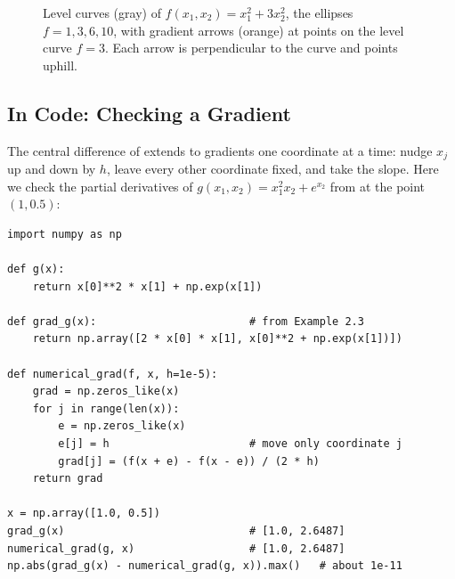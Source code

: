 \begin{figure}[ht]
  \centering
  \caption{Level curves (gray) of $f(x_1, x_2) = x_1^2 + 3x_2^2$, the
    ellipses $f = 1, 3, 6, 10$, with gradient arrows (orange) at points on
    the level curve $f = 3$. Each arrow is perpendicular to the curve and
    points uphill.}
  \label{fig:ch02-gradient}
\end{figure}

\subsection{In Code: Checking a Gradient}
\label{sec:ch02-gradient-code}

The central difference of  extends to gradients
one coordinate at a time: nudge $x_j$ up and down by $h$, leave every other
coordinate fixed, and take the slope. Here we check the partial derivatives
of $g(x_1, x_2) = x_1^2 x_2 + e^{x_2}$ from  at the
point $(1, 0.5)$:

\begin{lstlisting}
import numpy as np

def g(x):
    return x[0]**2 * x[1] + np.exp(x[1])

def grad_g(x):                        # from Example 2.3
    return np.array([2 * x[0] * x[1], x[0]**2 + np.exp(x[1])])

def numerical_grad(f, x, h=1e-5):
    grad = np.zeros_like(x)
    for j in range(len(x)):
        e = np.zeros_like(x)
        e[j] = h                      # move only coordinate j
        grad[j] = (f(x + e) - f(x - e)) / (2 * h)
    return grad

x = np.array([1.0, 0.5])
grad_g(x)                             # [1.0, 2.6487]
numerical_grad(g, x)                  # [1.0, 2.6487]
np.abs(grad_g(x) - numerical_grad(g, x)).max()   # about 1e-11
\end{lstlisting}

